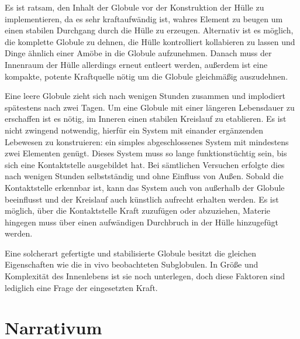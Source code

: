 \documentclass[a5paper,8pt]{book}
\begin{document}
Es ist ratsam, den Inhalt der Globule vor der Konstruktion der Hülle zu implementieren, da es sehr kraftaufwändig ist, 
wahres Element zu beugen um einen stabilen Durchgang durch die Hülle zu erzeugen. Alternativ ist es möglich, die komplette 
Globule zu dehnen, die Hülle  kontrolliert kollabieren zu lassen und Dinge ähnlich einer Amöbe in die Globule aufzunehmen.
Danach muss der Innenraum der Hülle allerdings erneut entleert werden, außerdem ist eine kompakte, potente Kraftquelle 
nötig um die Globule gleichmäßig auszudehnen. 

Eine leere Globule zieht sich nach wenigen Stunden zusammen und implodiert spätestens nach zwei Tagen. Um eine Globule mit 
einer längeren Lebensdauer zu erschaffen ist es nötig, im Inneren einen stabilen Kreislauf zu etablieren. Es ist nicht 
zwingend notwendig, hierfür ein System mit einander ergänzenden Lebewesen zu konstruieren: ein simples abgeschlossenes 
System mit mindestens zwei Elementen genügt. Dieses System muss so lange funktionstüchtig sein, bis sich eine Kontaktstelle 
ausgebildet hat. Bei sämtlichen Versuchen erfolgte dies nach wenigen Stunden selbstständig und ohne Einfluss von Außen. 
Sobald die Kontaktstelle erkennbar ist, kann das System auch von außerhalb der Globule beeinflusst und der Kreislauf auch 
künstlich aufrecht erhalten werden. Es ist möglich, über die Kontaktstelle Kraft zuzufügen oder abzuziehen, Materie 
hingegen muss über einen aufwändigen Durchbruch in der Hülle hinzugefügt werden.

Eine solcherart gefertigte und stabilisierte Globule besitzt die gleichen Eigenschaften wie die in vivo beobachteten 
Subglobulen. In Größe und Komplexität des Innenlebens ist sie noch unterlegen, doch diese Faktoren sind lediglich eine 
Frage der eingesetzten Kraft. 


\section{ Narrativum}
\end{document}
